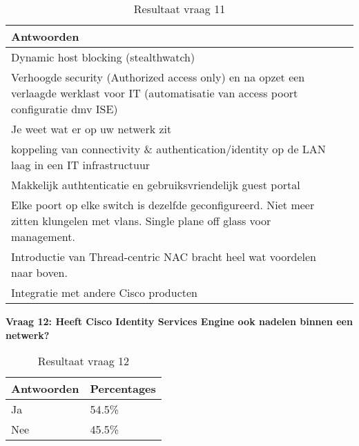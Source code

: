 \begin{table}[H]
	\begin{center}
		\setlength{}
		\noindent\begin{tabular}{p{\q}p{\q}}
		\hline
		\bf Antwoorden                                                                                                                              \\ \hline
		Dynamic host blocking (stealthwatch)                                                                                                         \\ \hline
		Verhoogde security (Authorized access only) en na opzet een verlaagde werklast voor IT (automatisatie van access poort configuratie dmv ISE) \\ \hline
		Je weet wat er op uw netwerk zit                                                                                                             \\ \hline
		koppeling van connectivity \& authentication/identity op de LAN laag in een IT infrastructuur                                                \\ \hline
		Makkelijk authtenticatie en gebruiksvriendelijk guest portal                                                                                 \\ \hline
		Elke poort op elke switch is dezelfde geconfigureerd.  Niet meer zitten klungelen met vlans. Single plane off glass voor management.         \\ \hline
		Introductie van Thread-centric NAC bracht heel wat voordelen naar boven.                                                                     \\ \hline
		Integratie met andere Cisco producten                                                                                                        \\ \hline                                                        
		\end{tabular}
		\caption{Resultaat vraag 11}
		\label{tab:vraag11}
	\end{center}
\end{table}

\textbf{Vraag 12: Heeft Cisco Identity Services Engine ook nadelen binnen een netwerk?}

\begin{table}[h!]
	\begin{center}
		\begin{tabular}{|l|l|}
			\hline
			\bf Antwoorden    & \bf Percentages \\ \hline
			Ja      & 54.5\% \\ \hline
			Nee     & 45.5\%    \\ \hline                                                      
		\end{tabular}
		\caption{Resultaat vraag 12}
	\end{center}
\end{table}

